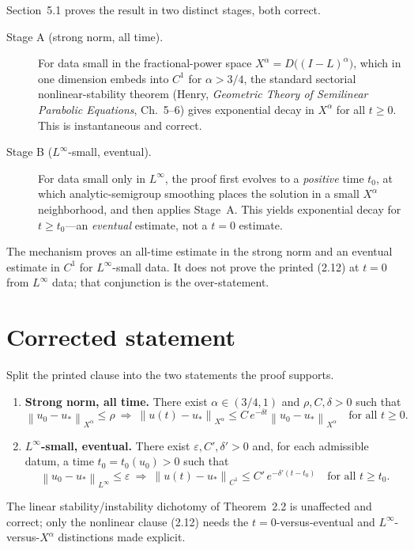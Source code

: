 \documentclass[11pt]{article}
\newcommand{\norm}[1]{\left\lVert #1\right\rVert}
\begin{document}
Section~5.1 proves the result in two distinct stages, both correct.
\begin{description}
\item[Stage A (strong norm, all time).]  For data small in the fractional-power
  space $X^{\alpha}=D\big((I-L)^{\alpha}\big)$, which in one dimension embeds
  into $C^{1}$ for $\alpha>3/4$, the standard sectorial nonlinear-stability
  theorem (Henry, \emph{Geometric Theory of Semilinear Parabolic Equations},
  Ch.~5--6) gives exponential decay in $X^{\alpha}$ for all $t\ge 0$.  This is
  instantaneous and correct.
\item[Stage B ($L^{\infty}$-small, eventual).]  For data small only in
  $L^{\infty}$, the proof first evolves to a \emph{positive} time $t_{0}$, at
  which analytic-semigroup smoothing places the solution in a small
  $X^{\alpha}$ neighborhood, and then applies Stage~A.  This yields exponential
  decay for $t\ge t_{0}$---an \emph{eventual} estimate, not a $t=0$ estimate.
\end{description}
The mechanism proves an all-time estimate in the strong norm and an eventual
estimate in $C^{1}$ for $L^{\infty}$-small data.  It does not prove the printed
(2.12) at $t=0$ from $L^{\infty}$ data; that conjunction is the over-statement.

\section{Corrected statement}

Split the printed clause into the two statements the proof supports.
\begin{enumerate}[label=(\arabic*)]
\item \textbf{Strong norm, all time.}  There exist $\alpha\in(3/4,1)$ and
  $\rho,C,\delta>0$ such that
  \[
    \norm{u_{0}-u_{*}}_{X^{\alpha}}\le\rho
    \ \Longrightarrow\
    \norm{u(t)-u_{*}}_{X^{\alpha}}\le C\,e^{-\delta t}\norm{u_{0}-u_{*}}_{X^{\alpha}}
    \quad\text{for all }t\ge 0 .
  \]
\item \textbf{$L^{\infty}$-small, eventual.}  There exist $\varepsilon,C',\delta'>0$
  and, for each admissible datum, a time $t_{0}=t_{0}(u_{0})>0$ such that
  \[
    \norm{u_{0}-u_{*}}_{L^{\infty}}\le\varepsilon
    \ \Longrightarrow\
    \norm{u(t)-u_{*}}_{C^{1}}\le C'\,e^{-\delta'(t-t_{0})}
    \quad\text{for all }t\ge t_{0} .
  \]
\end{enumerate}
The linear stability/instability dichotomy of Theorem~2.2 is unaffected and
correct; only the nonlinear clause (2.12) needs the $t=0$-versus-eventual and
$L^{\infty}$-versus-$X^{\alpha}$ distinctions made explicit.
\end{document}
